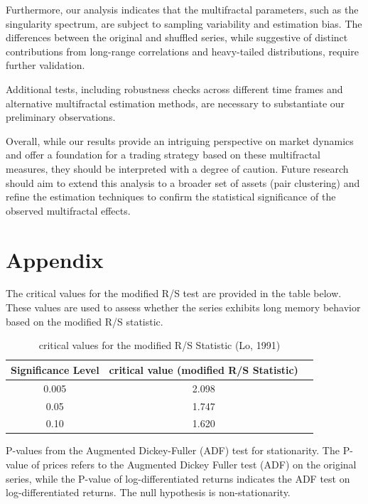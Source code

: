 \documentclass[11pt]{extarticle}
\begin{document}
Furthermore, our analysis indicates that the multifractal parameters, such as the singularity spectrum, are subject to
sampling variability and estimation bias. The differences between the original and shuffled series, while suggestive of
distinct contributions from long-range correlations and heavy-tailed distributions, require further validation.

Additional tests, including robustness checks across different time frames and alternative multifractal estimation
methods, are necessary to substantiate our preliminary observations.

Overall, while our results provide an intriguing perspective on market dynamics and offer a foundation for a trading
strategy based on these multifractal measures, they should be interpreted with a degree of caution. Future research
should aim to extend this analysis to a broader set of assets (pair clustering) and refine the estimation techniques
to confirm the statistical significance of the observed multifractal effects.

\section{Appendix}

The critical values for the modified R/S test are provided in the table below. These values are used to assess whether the series exhibits long memory behavior based on the modified R/S statistic.

\begin{table}[ht!]
\centering
\begin{tabular}{|c|c|c|}
\hline
\textbf{Significance Level} & \textbf{critical value (modified R/S Statistic)} \\
\hline
0.005 & 2.098\\
0.05 & 1.747\\
0.10 & 1.620\\

\hline
\end{tabular}
\caption{critical values for the modified R/S Statistic (Lo, 1991)}
    \label{table:critical_values}
\end{table}

\begin{table}[h!]
    \centering
    \caption{P-values from the Augmented Dickey-Fuller (ADF) test for stationarity. The P-value of prices refers to the Augmented Dickey Fuller test (ADF) on the original series,
     while the P-value of log-differentiated returns indicates the ADF test on log-differentiated returns. The null hypothesis is non-stationarity.}
    \label{tab:adf_results}
\end{table}
\end{document}
